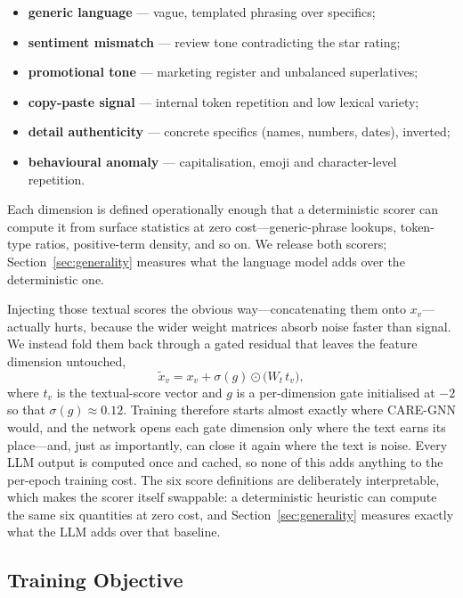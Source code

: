 \documentclass{conf}
\begin{document}
\begin{itemize}\setlength{\itemsep}{0pt}\setlength{\parskip}{0pt}
\item \textbf{generic language} --- vague, templated phrasing over specifics;
\item \textbf{sentiment mismatch} --- review tone contradicting the star rating;
\item \textbf{promotional tone} --- marketing register and unbalanced superlatives;
\item \textbf{copy-paste signal} --- internal token repetition and low lexical variety;
\item \textbf{detail authenticity} --- concrete specifics (names, numbers, dates), inverted;
\item \textbf{behavioural anomaly} --- capitalisation, emoji and character-level repetition.
\end{itemize}

\noindent Each dimension is defined operationally enough that a deterministic
scorer can compute it from surface statistics at zero cost---generic-phrase
lookups, token-type ratios, positive-term density, and so on. We release both
scorers; Section~\ref{sec:generality} measures what the language model adds over
the deterministic one.

Injecting those textual scores the obvious way---concatenating them onto
$x_v$---actually hurts, because the wider weight matrices absorb noise faster
than signal. We instead fold them back through a gated residual that leaves the
feature dimension untouched,
\begin{equation}
\label{eq:gate}
\tilde{x}_v = x_v + \sigma(g)\odot\big(W_t\, t_v\big),
\end{equation}
where $t_v$ is the textual-score vector and $g$ is a per-dimension gate
initialised at $-2$ so that $\sigma(g)\approx0.12$. Training therefore starts
almost exactly where CARE-GNN would, and the network opens each gate dimension
only where the text earns its place---and, just as importantly, can close it
again where the text is noise. Every LLM output is computed once and cached, so
none of this adds anything to the per-epoch training cost. The six score
definitions are deliberately interpretable, which makes the scorer itself
swappable: a deterministic heuristic can compute the same six quantities at
zero cost, and Section~\ref{sec:generality} measures exactly what the LLM adds
over that baseline.

\subsection{Training Objective}
\end{document}
